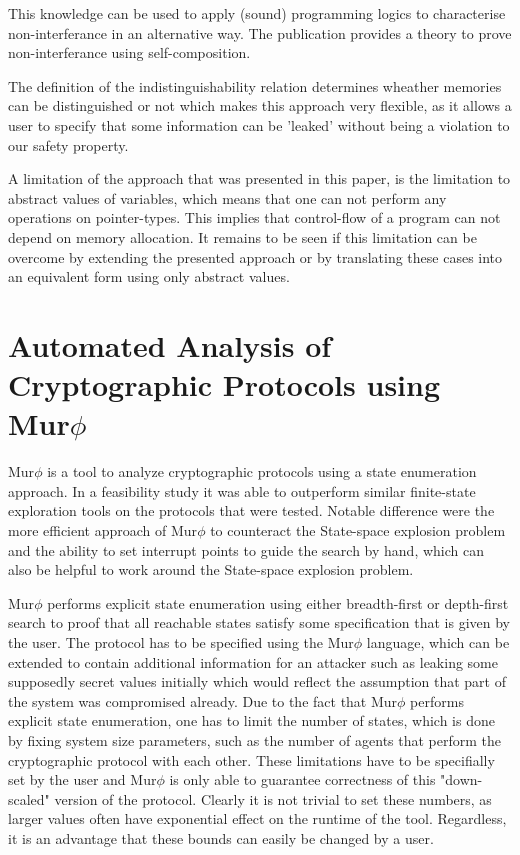 \documentclass[a4paper,UKenglish]{lipics-v2018}
\def\murphi{Mur$\phi$ }
\begin{document}
This knowledge can be used to apply (sound) programming logics to characterise non-interferance in an alternative way. The publication provides a theory to prove non-interferance using self-composition.

The definition of the indistinguishability relation determines wheather memories can be distinguished or not which makes this approach very flexible, as it allows a user to specify that some information can be 'leaked' without being a violation to our safety property.\cite{information_flow_by_self_composition}

A limitation of the approach that was presented in this paper, is the limitation to abstract values of variables\cite{information_flow_by_self_composition}, which means that one can not perform any operations on pointer-types. This implies that control-flow of a program can not depend on memory allocation. It remains to be seen if this limitation can be overcome by extending the presented approach or by translating these cases into an equivalent form using only abstract values.










\newpage
\section{Automated Analysis of Cryptographic Protocols using \murphi}

\murphi is a tool to analyze cryptographic protocols using a state enumeration approach. In a feasibility study it was able to outperform similar finite-state exploration tools on the protocols that were tested. Notable difference were the more efficient approach of \murphi to counteract the State-space explosion problem and the ability to set interrupt points to guide the search by hand, which can also be helpful to work around the State-space explosion problem.\cite{murphi}

\murphi performs explicit state enumeration using either breadth-first or depth-first search to proof that all reachable states satisfy some specification that is given by the user. The protocol has to be specified using the \murphi language, which can be extended to contain additional information for an attacker such as leaking some supposedly secret values initially which would reflect the assumption that part of the system was compromised already. Due to the fact that \murphi performs explicit state enumeration, one has to limit the number of states, which is done by fixing system size parameters, such as the number of agents that perform the cryptographic protocol with each other. These limitations have to be specifially set by the user and \murphi is only able to guarantee correctness of this "down-scaled" version of the protocol. Clearly it is not trivial to set these numbers, as larger values often have exponential effect on the runtime of the tool.\cite{murphi} Regardless, it is an advantage that these bounds can easily be changed by a user.
\end{document}
